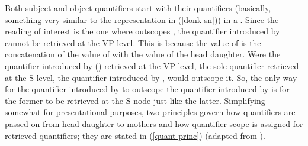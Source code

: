 \documentclass[output=paper]{langsci/langscibook}
\begin{document}
\begin{exe}
\ex\label{qu-sc}
\end{exe} 



Both subject and object quantifiers start with their quantifiers (basically, something very similar to the representation in (\ref{donk-sn})) in a . Since the reading of interest is the one where  outscopes , the quantifier introduced by  cannot be retrieved at the VP level. This is because the value of  is the concatenation of the value of  with the  value of the head daughter. Were the quantifier introduced by  () retrieved at the VP level, the sole quantifier retrieved at the S level, the quantifier introduced by , would outscope it. So, the only way for the quantifier introduced by  to outscope the quantifier introduced by  is for the former to be retrieved at the S node just like the latter. Simplifying somewhat for presentational purposes, two principles govern how quantifiers are passed on from head-daughter to mothers and how quantifier scope is assigned for retrieved quantifiers; they are stated in (\ref{quant-princ}) (adapted from \citealt[p.322-323]{ps2}).
\end{document}
